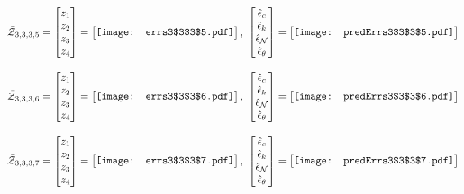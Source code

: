 \documentclass[12pt]{article}
\begin{document}
\begin{gather*}
\bar{\mathcal{Z}}_{3,3,3,5}=\begin{bmatrix}
z_1\\
z_2\\
z_3\\
z_4
 \end{bmatrix}= \begin{bmatrix}
\vcenter{\hbox{\texttt{[image: errs3\$3\$3\$5.pdf]}}}
 \end{bmatrix},\,\, \begin{bmatrix}
\hat{\epsilon}_c\\\hat{\epsilon}_k\\\hat{\epsilon}_\mathcal{N}\\\hat{\epsilon}_\theta
 \end{bmatrix}=\begin{bmatrix}
\vcenter{\hbox{\texttt{[image: predErrs3\$3\$3\$5.pdf]}}}
 \end{bmatrix}
\end{gather*}


\begin{gather*}
\bar{\mathcal{Z}}_{3,3,3,6}=\begin{bmatrix}
z_1\\
z_2\\
z_3\\
z_4
 \end{bmatrix}= \begin{bmatrix}
\vcenter{\hbox{\texttt{[image: errs3\$3\$3\$6.pdf]}}}
 \end{bmatrix},\,\, \begin{bmatrix}
\hat{\epsilon}_c\\\hat{\epsilon}_k\\\hat{\epsilon}_\mathcal{N}\\\hat{\epsilon}_\theta
 \end{bmatrix}=\begin{bmatrix}
\vcenter{\hbox{\texttt{[image: predErrs3\$3\$3\$6.pdf]}}}
 \end{bmatrix}
\end{gather*}


\begin{gather*}
\bar{\mathcal{Z}}_{3,3,3,7}=\begin{bmatrix}
z_1\\
z_2\\
z_3\\
z_4
 \end{bmatrix}= \begin{bmatrix}
\vcenter{\hbox{\texttt{[image: errs3\$3\$3\$7.pdf]}}}
 \end{bmatrix},\,\, \begin{bmatrix}
\hat{\epsilon}_c\\\hat{\epsilon}_k\\\hat{\epsilon}_\mathcal{N}\\\hat{\epsilon}_\theta
 \end{bmatrix}=\begin{bmatrix}
\vcenter{\hbox{\texttt{[image: predErrs3\$3\$3\$7.pdf]}}}
 \end{bmatrix}
\end{gather*}
\end{document}
